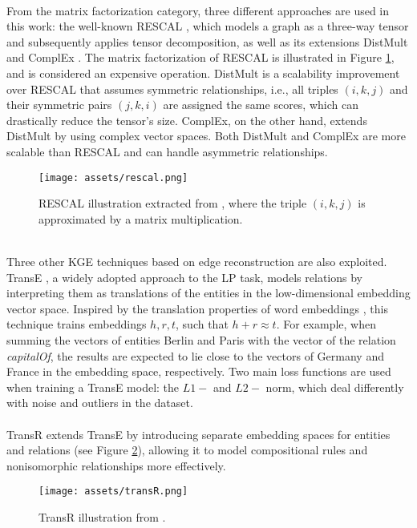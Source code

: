 \documentclass[11pt,titlepage,oneside,openany]{book}
\begin{document}
\\
From the matrix factorization category, three different approaches are used in this work: the well-known RESCAL \cite{nickel_three-way_2011}, which models a graph as a three-way tensor and subsequently applies tensor decomposition, as well as its extensions DistMult \cite{yang_embedding_2014} and ComplEx \cite{trouillon_complex_2016}. The matrix factorization of RESCAL is illustrated in Figure \ref{fig:rescal}, and is considered an expensive operation. DistMult is a scalability improvement over RESCAL that assumes symmetric relationships, i.e., all triples $(i, k, j)$ and their symmetric pairs $(j, k, i)$ are assigned the same scores, which can drastically reduce the tensor's size. ComplEx, on the other hand, extends DistMult by using complex vector spaces. Both DistMult and ComplEx are more scalable than RESCAL and can handle asymmetric relationships.\\
\begin{figure}[h!]
    \centering
    \centerline{\texttt{[image: assets/rescal.png]}}
    \caption{RESCAL illustration extracted from \cite{krompass_querying_2014}, where the triple $(i, k, j)$ is approximated by a matrix multiplication.}
    \label{fig:rescal}
\end{figure}
\\
Three other KGE techniques based on edge reconstruction are also exploited. TransE \cite{bordes_translating_2013}, a widely adopted approach to the LP task, models relations by interpreting them as translations of the entities in the low-dimensional embedding vector space. Inspired by the translation properties of word embeddings \cite{mikolov_efficient_2013}, this technique trains embeddings $h, r, t$, such that $h + r \approx t$. For example, when summing the vectors of entities Berlin and Paris with the vector of the relation \textit{capitalOf}, the results are expected to lie close to the vectors of Germany and France in the embedding space, respectively. Two main loss functions are used when training a TransE model: the $L1-$ and $L2-$ norm, which deal differently with noise and outliers in the dataset. \\
\\
TransR \cite{lin_learning_2015} extends TransE by introducing separate embedding spaces for entities and relations (see Figure \ref{fig:transr}), allowing it to model compositional rules and nonisomorphic relationships more effectively. \\
\begin{figure}[h!]
    \centering
    \centerline{\texttt{[image: assets/transR.png]}}
    \vspace*{-3mm}
    \caption{TransR illustration from \cite{lin_learning_2015}.}
    \label{fig:transr}
\end{figure}
\end{document}
